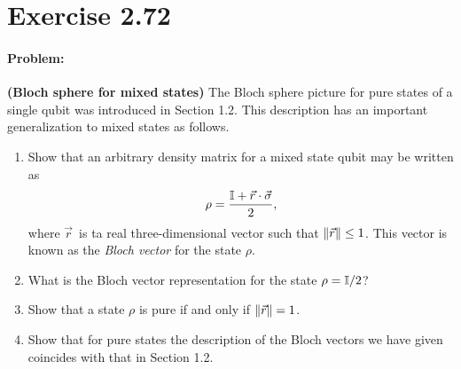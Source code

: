 \section*{Exercise 2.72}
\paragraph{Problem:} \textbf{(Bloch sphere for mixed states)} The Bloch sphere picture for pure states of a single qubit was introduced in Section 1.2. This description has an important generalization to mixed states as follows.
\begin{enumerate}[label=(\arabic*)]
    \item Show that an arbitrary density matrix for a mixed state qubit may be written as 
        \begin{equation}
            \rho = \frac{\mathbb{I} + \vec{r} \cdot \vec{\sigma}}{2},
        \end{equation}
    where $\vec{r}$ is ta real three-dimensional vector such that $\norm{\vec{r}} \leq 1$. This vector is known as the \textit{Bloch vector} for the state $\rho$.
    \item What is the Bloch vector representation for the state $\rho = \mathbb{I} / 2$?
    \item Show that a state $\rho$ is pure if and only if $\norm{\vec{r}} = 1$.
    \item Show that for pure states the description of the Bloch vectors we have given coincides with that in Section 1.2.
\end{enumerate}


